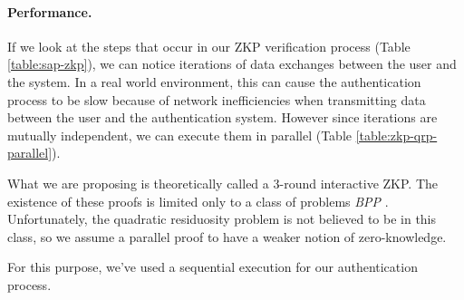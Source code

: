 \paragraph{Performance.}
If we look at the steps that occur in our ZKP verification process (Table \ref{table:sap-zkp}), we can notice iterations of data exchanges between the user and the system.
In a real world environment, this can cause the authentication process to be slow because of network inefficiencies when transmitting data between the user and the authentication system.
However since iterations are mutually independent, we can execute them in parallel (Table \ref{table:zkp-qrp-parallel}).

\begin{table*}[h!]
	\centering
		\caption{Parallel ZKP Construction}
		\vspace{0.2cm}
	\label{table:zkp-qrp-parallel}
\end{table*}

What we are proposing is theoretically called a 3-round interactive ZKP.
The existence of these proofs is limited only to a class of problems \textit{BPP} \cite{goldreich1996composition}.
Unfortunately, the quadratic residuosity problem is not believed to be in this class, so we assume a parallel proof to have a weaker notion of zero-knowledge.

For this purpose, we've used a sequential execution for our authentication process.